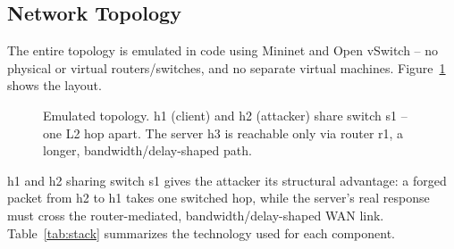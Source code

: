 \documentclass[11pt]{article}
\begin{document}
\subsection{Network Topology}

The entire topology is emulated in code using Mininet and Open vSwitch
-- no physical or virtual routers/switches, and no separate virtual
machines. Figure~\ref{fig:topology} shows the layout.

\begin{figure}[H]
\centering
{}
\caption{Emulated topology. h1 (client) and h2 (attacker) share switch
s1 -- one L2 hop apart. The server h3 is reachable only via router r1,
a longer, bandwidth/delay-shaped path.}
\label{fig:topology}
\end{figure}

h1 and h2 sharing switch s1 gives the attacker its structural advantage:
a forged packet from h2 to h1 takes one switched hop, while the server's
real response must cross the router-mediated, bandwidth/delay-shaped WAN
link. Table~\ref{tab:stack} summarizes the technology used for each
component.
\end{document}
